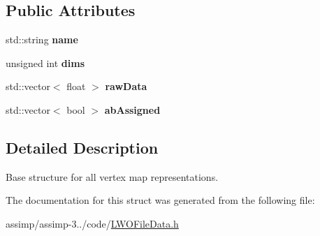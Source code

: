 \subsection*{Public Attributes}
\begin{DoxyCompactItemize}
\item 
\hypertarget{struct_assimp_1_1_l_w_o_1_1_v_map_entry_a570af20e8a609f0daf56e77cee8e5f4e}{std\+::string {\bfseries name}}\label{struct_assimp_1_1_l_w_o_1_1_v_map_entry_a570af20e8a609f0daf56e77cee8e5f4e}

\item 
\hypertarget{struct_assimp_1_1_l_w_o_1_1_v_map_entry_a71bd60f25fa8ffa723fffbc6e8cd4a22}{unsigned int {\bfseries dims}}\label{struct_assimp_1_1_l_w_o_1_1_v_map_entry_a71bd60f25fa8ffa723fffbc6e8cd4a22}

\item 
\hypertarget{struct_assimp_1_1_l_w_o_1_1_v_map_entry_a92e979f348f6d6b428c0f850441d40e8}{std\+::vector$<$ float $>$ {\bfseries raw\+Data}}\label{struct_assimp_1_1_l_w_o_1_1_v_map_entry_a92e979f348f6d6b428c0f850441d40e8}

\item 
\hypertarget{struct_assimp_1_1_l_w_o_1_1_v_map_entry_a5821e12f054d900c4a982b24c2869b6c}{std\+::vector$<$ bool $>$ {\bfseries ab\+Assigned}}\label{struct_assimp_1_1_l_w_o_1_1_v_map_entry_a5821e12f054d900c4a982b24c2869b6c}

\end{DoxyCompactItemize}


\subsection{Detailed Description}
Base structure for all vertex map representations. 

The documentation for this struct was generated from the following file\+:\begin{DoxyCompactItemize}
\item 
assimp/assimp-\/3../code/\hyperlink{_l_w_o_file_data_8h}{L\+W\+O\+File\+Data.\+h}\end{DoxyCompactItemize}
